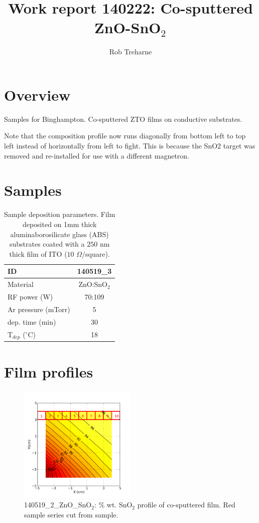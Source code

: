\documentclass{article}
\title{Work report 140222: Co-sputtered ZnO-SnO$_2$}
\author{Rob Treharne}
\begin{document}
\maketitle

\section{Overview}

Samples for Binghampton. Co-sputtered ZTO films on conductive substrates.

Note that the composition profile now runs diagonally from bottom left to top left instead of horizontally from left to fight. This is because the SnO2 target was removed and re-installed for use with a different magnetron.


\section{Samples}

\begin{table}[h!]
\caption{Sample deposition parameters. Film deposited on 1mm thick aluminaborosilicate glass (ABS) substrates coated with a $250$ nm thick film of ITO ($10$ $\Omega/$square).}
\centering
\begin{tabular}{l|c}
\hline\hline
 ID & 140519\_3  \\
\hline
Material & ZnO:SnO$_2$  \\
RF power (W) & 70:109 \\
Ar pressure (mTorr) & 5  \\
dep. time (min) & 30 \\
T$_{dep}$ ($^{\circ}$C) & 18  \\
\hline
\end{tabular}
\end{table}




\section{Film profiles}

\begin{figure}[ht]
\centering
\includegraphics[width=0.5\textwidth]{140519_3_ZnO_SnO2_pieces_70-109.png}
\caption{\label{fig:3} 140519\_2\_ZnO\_SnO$_2$: $\%$ wt. SnO$_2$ profile of co-sputtered film. Red sample series cut from sample.}
\end{figure}
\end{document}
